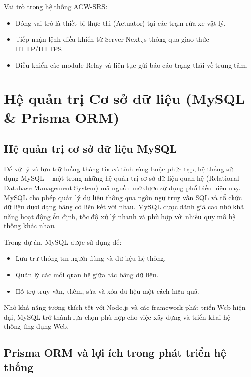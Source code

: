 \documentclass[../main.tex]{subfiles}
\begin{document}
Vai trò trong hệ thống ACW-SRS:
\begin{itemize}
    \item Đóng vai trò là thiết bị thực thi (Actuator) tại các trạm rửa xe vật lý.
    \item Tiếp nhận lệnh điều khiển từ Server Next.js thông qua giao thức HTTP/HTTPS.
    \item Điều khiển các module Relay và liên tục gửi báo cáo trạng thái về trung tâm.
\end{itemize}

\section{Hệ quản trị Cơ sở dữ liệu (MySQL \& Prisma ORM)}

\subsection{Hệ quản trị cơ sở dữ liệu MySQL}

Để xử lý và lưu trữ luồng thông tin có tính ràng buộc phức tạp, hệ thống sử dụng MySQL -- một trong những hệ quản trị cơ sở dữ liệu quan hệ (Relational Database Management System) mã nguồn mở được sử dụng phổ biến hiện nay. MySQL cho phép quản lý dữ liệu thông qua ngôn ngữ truy vấn SQL và tổ chức dữ liệu dưới dạng bảng có liên kết với nhau. MySQL được đánh giá cao nhờ khả năng hoạt động ổn định, tốc độ xử lý nhanh và phù hợp với nhiều quy mô hệ thống khác nhau.

Trong dự án, MySQL được sử dụng để:
\begin{itemize}
    \item Lưu trữ thông tin người dùng và dữ liệu hệ thống.
    \item Quản lý các mối quan hệ giữa các bảng dữ liệu.
    \item Hỗ trợ truy vấn, thêm, sửa và xóa dữ liệu một cách hiệu quả.
\end{itemize}

Nhờ khả năng tương thích tốt với Node.js và các framework phát triển Web hiện đại, MySQL trở thành lựa chọn phù hợp cho việc xây dựng và triển khai hệ thống ứng dụng Web.

\subsection{Prisma ORM và lợi ích trong phát triển hệ thống}
\end{document}
